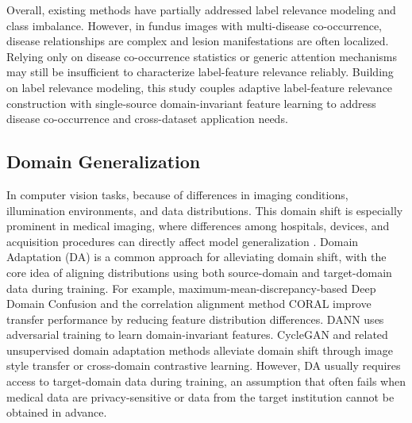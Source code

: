 Overall, existing methods have partially addressed label relevance modeling and class imbalance. However, in fundus images with multi-disease co-occurrence, disease relationships are complex and lesion manifestations are often localized. Relying only on disease co-occurrence statistics or generic attention mechanisms may still be insufficient to characterize label-feature relevance reliably.  Building on label relevance modeling, this study couples adaptive label-feature relevance construction with single-source domain-invariant feature learning to address disease co-occurrence and cross-dataset application needs.

\subsection{Domain Generalization}

In computer vision tasks,  because of differences in imaging conditions, illumination environments, and data distributions. This domain shift is especially prominent in medical imaging, where differences among hospitals, devices, and acquisition procedures can directly affect model generalization \cite{_Ref213949439}.  Domain Adaptation (DA) is a common approach for alleviating domain shift, with the core idea of aligning distributions using both source-domain and target-domain data during training. For example, maximum-mean-discrepancy-based Deep Domain Confusion \cite{_Ref213949448} and the correlation alignment method CORAL \cite{_Ref213949453} improve transfer performance by reducing feature distribution differences. DANN \cite{_Ref213949479} uses adversarial training to learn domain-invariant features. CycleGAN \cite{_Ref213949490} and related unsupervised domain adaptation methods \cite{_Ref213949530} alleviate domain shift through image style transfer or cross-domain contrastive learning. However, DA usually requires access to target-domain data during training, an assumption that often fails when medical data are privacy-sensitive or data from the target institution cannot be obtained in advance.

